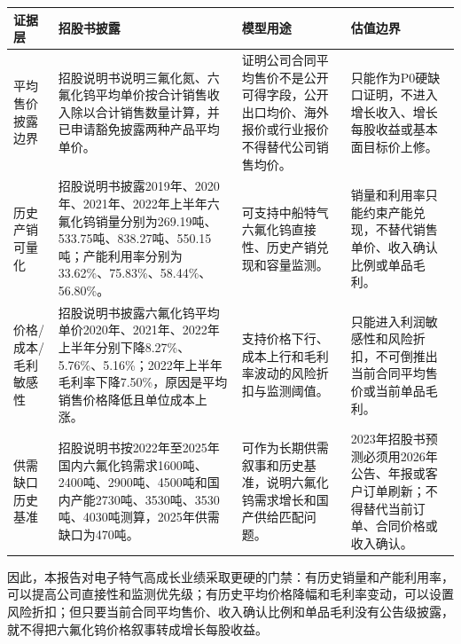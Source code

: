 \begin{exhibitbox}
\scriptsize
\begin{tabularx}{\exhibitboxwidth}{L{1.5cm} X X X}
\toprule
\textbf{证据层} & \textbf{招股书披露} & \textbf{模型用途} & \textbf{估值边界} \\
\midrule
平均售价披露边界 & 招股说明书说明三氟化氮、六氟化钨平均单价按合计销售收入除以合计销售数量计算，并已申请豁免披露两种产品平均单价。 & 证明公司合同平均售价不是公开可得字段，公开出口均价、海外报价或行业报价不得替代公司销售均价。 & 只能作为P0硬缺口证明，不进入增长收入、增长每股收益或基本面目标价上修。 \\
历史产销可量化 & 招股说明书披露2019年、2020年、2021年、2022年上半年六氟化钨销量分别为269.19吨、533.75吨、838.27吨、550.15吨；产能利用率分别为33.62\%、75.83\%、58.44\%、56.80\%。 & 可支持中船特气六氟化钨直接性、历史产销兑现和容量监测。 & 销量和利用率只能约束产能兑现，不替代销售单价、收入确认比例或单品毛利。 \\
价格/成本/毛利敏感性 & 招股说明书披露六氟化钨平均单价2020年、2021年、2022年上半年分别下降8.27\%、5.76\%、5.16\%；2022年上半年毛利率下降7.50\%，原因是平均销售价格降低且单位成本上涨。 & 支持价格下行、成本上行和毛利率波动的风险折扣与监测阈值。 & 只能进入利润敏感性和风险折扣，不可倒推出当前合同平均售价或当前单品毛利。 \\
供需缺口历史基准 & 招股说明书按2022年至2025年国内六氟化钨需求1600吨、2400吨、2900吨、4500吨和国内产能2730吨、3530吨、3530吨、4030吨测算，2025年供需缺口为470吨。 & 可作为长期供需叙事和历史基准，说明六氟化钨需求增长和国产供给匹配问题。 & 2023年招股书预测必须用2026年公告、年报或客户订单刷新；不得替代当前订单、合同价格或收入确认。 \\
\bottomrule
\end{tabularx}
\end{exhibitbox}

因此，本报告对电子特气高成长业绩采取更硬的门禁：有历史销量和产能利用率，可以提高公司直接性和监测优先级；有历史平均价格降幅和毛利率变动，可以设置风险折扣；但只要当前合同平均售价、收入确认比例和单品毛利没有公告级披露，就不得把六氟化钨价格叙事转成增长每股收益。

